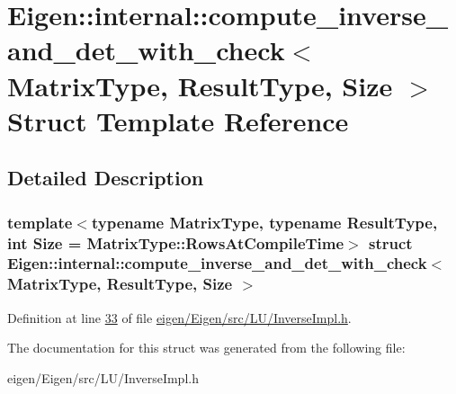 \hypertarget{struct_eigen_1_1internal_1_1compute__inverse__and__det__with__check}{}\section{Eigen\+:\+:internal\+:\+:compute\+\_\+inverse\+\_\+and\+\_\+det\+\_\+with\+\_\+check$<$ Matrix\+Type, Result\+Type, Size $>$ Struct Template Reference}
\label{struct_eigen_1_1internal_1_1compute__inverse__and__det__with__check}


\subsection{Detailed Description}
\subsubsection*{template$<$typename Matrix\+Type, typename Result\+Type, int Size = Matrix\+Type\+::\+Rows\+At\+Compile\+Time$>$\newline
struct Eigen\+::internal\+::compute\+\_\+inverse\+\_\+and\+\_\+det\+\_\+with\+\_\+check$<$ Matrix\+Type, Result\+Type, Size $>$}



Definition at line \hyperlink{eigen_2_eigen_2src_2_l_u_2_inverse_impl_8h_source_l00033}{33} of file \hyperlink{eigen_2_eigen_2src_2_l_u_2_inverse_impl_8h_source}{eigen/\+Eigen/src/\+L\+U/\+Inverse\+Impl.\+h}.



The documentation for this struct was generated from the following file\+:\begin{DoxyCompactItemize}
\item 
eigen/\+Eigen/src/\+L\+U/\+Inverse\+Impl.\+h\end{DoxyCompactItemize}
